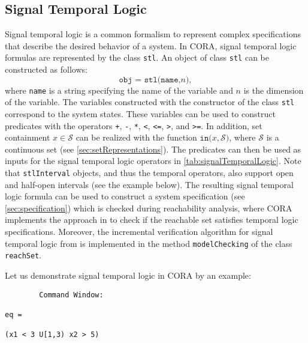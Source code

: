 \subsection{Signal Temporal Logic}
\label{sec:temporalLogic}

Signal temporal logic is a common formalism to represent complex specifications that describe the desired behavior of a system. In CORA, signal temporal logic formulas are represented by the class \texttt{stl}. An object of class \texttt{stl} can be constructed as follows:
\begin{equation*}
	\texttt{obj = stl(name,}n\texttt{)},
\end{equation*}
where \texttt{name} is a string specifying the name of the variable and $n$ is the dimension of the variable. The variables constructed with the constructor of the class \texttt{stl} correspond to the system states. These variables can be used to construct predicates with the operators \texttt{+}, \texttt{-}, \texttt{*}, \texttt{<}, \texttt{<=}, \texttt{>}, and \texttt{>=}. In addition, set containment $x \in \mathcal{S}$ can be realized with the function $\texttt{in(}x,\mathcal{S}\texttt{)}$, where $\mathcal{S}$ is a continuous set (see \cref{sec:setRepresentations}). The predicates can then be used as inputs for the signal temporal logic operators in \cref{tab:signalTemporalLogic}. Note that \texttt{stlInterval} objects, and thus the temporal operators, also support open and half-open intervals (see the example below). The resulting signal temporal logic formula can be used to construct a system specification (see \cref{sec:specification}) which is checked during reachability analysis, where CORA implements the approach in \cite{Roehm2016b} to check if the reachable set satisfies temporal logic specifications. Moreover, the incremental verification algorithm for signal temporal logic from \cite{Lercher2024} is implemented in the method \texttt{modelChecking} of the class \texttt{reachSet}.

Let us demonstrate signal temporal logic in CORA by an example:

\begin{center}
\begin{minipage}[t]{0.65\textwidth}
	\vspace{10pt}
	\footnotesize
	
\end{minipage}
\begin{minipage}[t]{0.3\textwidth}
	\vspace{10pt}
	\begin{verbatim}
		Command Window:	
	
eq = 

(x1 < 3 U[1,3) x2 > 5)
  
  
	\end{verbatim}
\end{minipage}  
\end{center}


